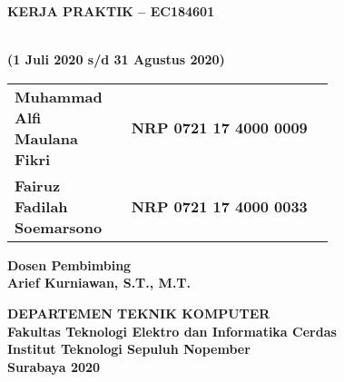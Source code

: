 

\begin{flushleft}

  \sffamily

  \noindent\textbf{KERJA PRAKTIK – EC184601}
  \vspace{4ex}

   \\
  \textbf{(1 Juli 2020 s/d 31 Agustus 2020)}
  \vspace{6ex}

  \vspace{6ex}

  \begin{adjustwidth}{-0.2cm}{}
    \begin{tabular}{lcp{0.7\linewidth}}
      \textbf{Muhammad Alfi Maulana Fikri} & & \textbf{NRP 0721 17 4000 0009} \\
      \textbf{Fairuz Fadilah Soemarsono} & & \textbf{NRP 0721 17 4000 0033} \\
    \end{tabular}
  \end{adjustwidth}
  \vspace{4ex}

  \noindent
  \textbf{Dosen Pembimbing} \\
  \textbf{Arief Kurniawan, S.T., M.T.}
  \vspace{12ex}

  \noindent\textbf{DEPARTEMEN TEKNIK KOMPUTER} \\
  \textbf{Fakultas Teknologi Elektro dan Informatika Cerdas} \\
  \textbf{Institut Teknologi Sepuluh Nopember} \\
  \textbf{Surabaya 2020}

\end{flushleft}

\restoregeometry